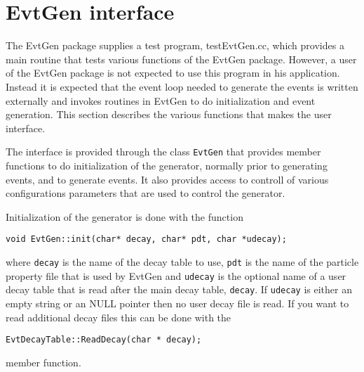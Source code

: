 \section{EvtGen interface}
\label{sect:interface}



The EvtGen package supplies a test program, testEvtGen.cc, which
provides a main routine that tests various functions of the
EvtGen package. However, a user of the EvtGen package is not
expected to use this program in his application. Instead 
it is expected that the event loop needed to generate the 
events is written externally and invokes routines in EvtGen 
to do initialization and event generation. This section
describes the various functions that makes the user 
interface. 

The interface is provided through the class {\tt EvtGen} that
provides member functions to do initialization of the
generator, normally prior to generating events, and to
generate events. It also provides access to controll of
various configurations parameters that are used to control
the generator.

Initialization of the generator is done with the function
\begin{verbatim}
void EvtGen::init(char* decay, char* pdt, char *udecay);
\end{verbatim} 
where {\tt decay} is the name of the decay table to use, 
{\tt pdt} is the name of the particle property file that is
used by EvtGen and {\tt udecay} is the optional name of a
user decay table that is read after the main decay table,
{\tt decay}. If {\tt udecay} is either an empty string or
an NULL pointer then no user decay file is read.
If you want to read additional decay files this can be
done with the 
\begin{verbatim}
EvtDecayTable::ReadDecay(char * decay);
\end{verbatim}
member function. 

